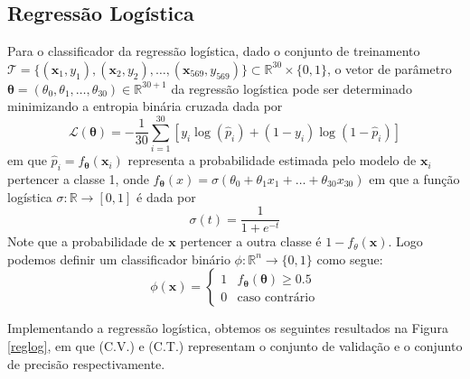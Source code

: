 \documentclass{pssbmac}
\begin{document}
\subsection{Regressão Logística}
Para o classificador da regressão logística, dado o conjunto de treinamento\\ $\mathcal{T} =\{(\boldsymbol{x}_1, y_1), (\boldsymbol{x}_2, y_2),\dots, (\boldsymbol{x}_{569}, y_{569})\}\subset\mathbb{R}^{30}\times\{0,1\}$, o vetor de parâmetro $\boldsymbol{\theta}=(\theta_0, \theta_1, \dots,\theta_{30})\in\mathbb{R}^{30+1}$ da regressão logística pode ser determinado minimizando a entropia binária cruzada dada por
\begin{equation}
    \mathcal{L}(\boldsymbol{\theta}) = -\frac{1}{30}\sum\limits_{i=1}^{30}[y_i\log{(\hat{p}_i)} + (1-y_i)\log{(1-\hat{p}_i)}]
\end{equation}
em que $\hat{p}_i=f_{\boldsymbol{\theta}}(\boldsymbol{x}_i)$ representa a probabilidade estimada pelo modelo de $\boldsymbol{x}_i$ pertencer a classe 1, onde $f_{\boldsymbol{\theta}}(x) = \sigma (\theta_0 + \theta_1x_1 + \dots + \theta_{30}x_{30})$ em que a função logística $\sigma:\mathbb{R}\to[0, 1]$ é dada por
\begin{equation}
    \sigma(t)=\frac{1}{1 + e^{-t}}
\end{equation}
Note que a probabilidade de $\boldsymbol{x}$ pertencer a outra classe é $1-f_{\theta}(\boldsymbol{x})$. Logo podemos definir um classificador binário $\phi:\mathbb{R}^n\to\{0, 1\}$ como segue:
\begin{equation}
    \phi(\boldsymbol{x})=\left\{\begin{array}{cr}
         1&  f_{\boldsymbol{\theta}}(\boldsymbol{\theta})\geq 0.5\\
         0& \text{caso contrário}
    \end{array}\right.
\end{equation}

Implementando a regressão logística, obtemos os seguintes resultados na Figura \ref{reglog}, em que (C.V.) e (C.T.) representam o conjunto de validação e o conjunto de precisão respectivamente.
\end{document}
